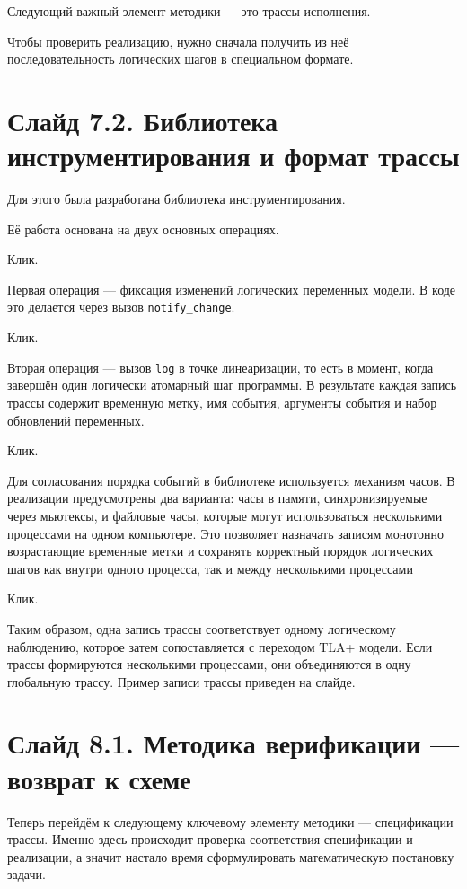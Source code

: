 \documentclass[12pt,a4paper]{article}
\begin{document}
Следующий важный элемент методики --- это трассы исполнения.

Чтобы проверить реализацию, нужно сначала получить из неё
последовательность логических шагов в специальном формате.

\section*{Слайд 7.2. Библиотека инструментирования и формат трассы}

Для этого была разработана библиотека инструментирования.

Её работа основана на двух основных операциях.

Клик.

Первая операция --- фиксация изменений логических переменных модели.
В коде это делается через вызов \texttt{notify\_change}.

Клик.

Вторая операция --- вызов \texttt{log} в точке линеаризации, то есть в
момент, когда завершён один логически атомарный шаг программы.
В результате каждая запись трассы содержит временную метку, имя
события, аргументы события и набор обновлений переменных.

Клик.

Для согласования порядка событий в библиотеке используется механизм
часов. В реализации предусмотрены два варианта: часы в памяти,
синхронизируемые через мьютексы, и файловые часы, которые могут
использоваться несколькими процессами на одном компьютере. Это
позволяет назначать записям монотонно возрастающие временные метки и
сохранять корректный порядок логических шагов как внутри одного
процесса, так и между несколькими процессами

Клик.

Таким образом, одна запись трассы соответствует одному логическому
наблюдению, которое затем сопоставляется с переходом TLA+ модели.
Если трассы формируются несколькими процессами, они объединяются в
одну глобальную трассу. Пример записи трассы приведен на слайде.

\section*{Слайд 8.1. Методика верификации --- возврат к схеме}

Теперь перейдём к следующему ключевому элементу методики ---
спецификации трассы. Именно здесь происходит проверка соответствия
спецификации и реализации, а значит настало время сформулировать
математическую постановку задачи.
\end{document}
